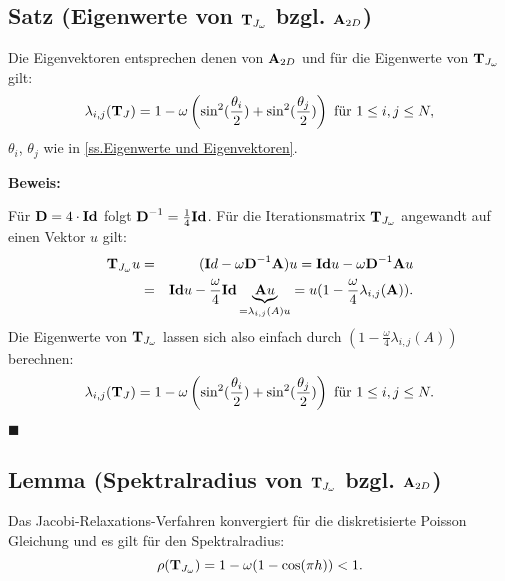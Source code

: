 \subsection{Satz (Eigenwerte von ${\textbf{T}}_{J_{\omega}}$ bzgl. ${\textbf{A}}_{2D}$)}\label{ss.EW Relax}

Die Eigenvektoren entsprechen denen von ${\textbf{A}}_{2D}$ und für die Eigenwerte von ${\textbf{T}}_{J_{\omega}}$ gilt:
\begin{equation}
\lambda_{i,j}({\textbf{T}}_{J}) = 1 - \omega \left(\sin^{2}(\frac {\theta_{i}} {2}) + \sin^{2}(\frac {\theta_{j}} {2}) \right) \textnormal{ für } 1 \le i,j \le N,\label{eq.Jacobi-Eigenwerte}
\end{equation}
$\theta_{i}$, $\theta_{j}$ wie in \autoref{ss.Eigenwerte und Eigenvektoren}.

\textbf{Beweis:}\label{sss.EW JacobiRelax}

Für ${\textbf{D}} = 4 \cdot {\textbf{Id}}$ folgt ${\textbf{D}}^{-1} = \frac {1} {4} {\textbf{Id}}$. Für die Iterationsmatrix ${\textbf{T}}_{J_{\omega}}$ angewandt auf einen Vektor $u$ gilt:
\begin{eqnarray}
{\textbf{T}}_{J_{\omega}}u &=& ({\textbf{I}}d - \omega {\textbf{D}}^{-1}{\textbf{A}})u = {\textbf{Id}} u - \omega {\textbf{D}}^{-1} {\textbf{A}} u \notag \\
&=&{\textbf{Id}} u - \frac {\omega} {4} {\textbf{Id}} \underbrace{{\textbf{A}}u}_{=\lambda_{i,j}(A) u} = u (1 - \frac {\omega} {4} \lambda_{i,j}({\textbf{A}})). \notag
\end{eqnarray}
Die Eigenwerte von ${\textbf{T}}_{J_{\omega}}$ lassen sich also einfach durch $(1 - \frac {\omega} {4} \lambda_{i,j}(A))$ berechnen:
\begin{equation}
\lambda_{i,j}({\textbf{T}}_{J}) = 1 - \omega \left(\sin^{2}(\frac {\theta_{i}} {2}) + \sin^{2}(\frac {\theta_{j}} {2}) \right) \textnormal{ für } 1 \le i,j \le N. \notag
\end{equation}
\begin{flushright}
$\blacksquare$
\end{flushright}

\subsection{Lemma (Spektralradius von ${\textbf{T}}_{J_{\omega}}$ bzgl. ${\textbf{A}}_{2D}$)}\label{ss.Spektralradius Jacobi Relax}

Das Jacobi-Relaxations-Verfahren konvergiert für die diskretisierte Poisson Gleichung und es gilt für den Spektralradius:
\begin{equation}
\rho({\textbf{T}}_{J_{\omega}}) = 1 - \omega(1 - \cos (\pi h)) < 1.
\end{equation}

